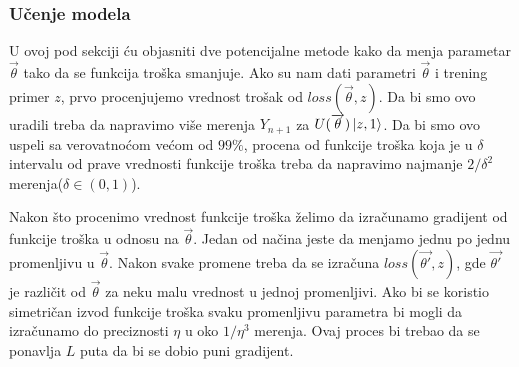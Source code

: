 \documentclass[12pt, letterpaper, oneside]{article}
\begin{document}
\subsubsection{Učenje modela}
U ovoj pod sekciji ću objasniti dve potencijalne metode kako da menja parametar $\overrightarrow{\theta}$ tako da se funkcija troška smanjuje.
Ako su nam dati parametri $\overrightarrow{\theta}$ i trening primer $z$, prvo procenjujemo vrednost trošak od $\mathit{loss}(\overrightarrow{\theta},z)$.
Da bi smo ovo uradili treba da napravimo više merenja $Y_{n+1}$ za $U(\overrightarrow{\theta})\Ket{z,1}$.
Da bi smo ovo uspeli sa verovatnoćom većom od $99\%$, procena od funkcije troška koja je u $\delta$ intervalu od prave vrednosti funkcije troška
treba da napravimo najmanje $2/\delta^2$ merenja($\delta \in (0,1)$).

Nakon što procenimo vrednost funkcije troška želimo da izračunamo gradijent od funkcije troška u odnosu na $\overrightarrow{\theta}$.
Jedan od načina jeste da menjamo jednu po jednu promenljivu u $\overrightarrow{\theta}$. Nakon svake promene treba da se izračuna
$\mathit{loss}(\overrightarrow{\theta'},z)$, gde $\overrightarrow{\theta'}$ je različit od $\overrightarrow{\theta}$ za neku malu vrednost u jednoj promenljivi.
Ako bi se koristio simetričan izvod funkcije troška svaku promenljivu parametra bi mogli da izračunamo do preciznosti $\eta$ u oko $1/\eta^3$ merenja.
Ovaj proces bi trebao da se ponavlja $L$ puta da bi se dobio puni gradijent.
\end{document}
